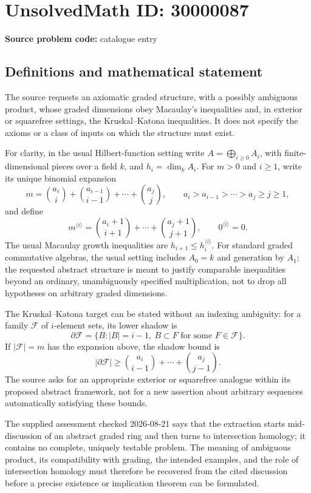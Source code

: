 \documentclass[11pt]{article}
\begin{document}
\section*{UnsolvedMath ID: 30000087}
\textbf{Source problem code:} catalogue entry
\subsection{Definitions and mathematical statement}
The source requests an axiomatic graded structure, with a possibly ambiguous product, whose graded dimensions obey Macaulay's inequalities and, in exterior or squarefree settings, the Kruskal--Katona inequalities. It does not specify the axioms or a class of inputs on which the structure must exist.

For clarity, in the usual Hilbert-function setting write \(A=\bigoplus_{i\geq0}A_i\), with finite-dimensional pieces over a field \(k\), and \(h_i=\dim_k A_i\). For \(m>0\) and \(i\geq1\), write its unique binomial expansion
\[
m=\binom{a_i}{i}+\binom{a_{i-1}}{i-1}+\cdots+\binom{a_j}{j},
\qquad a_i>a_{i-1}>\cdots>a_j\geq j\geq1,
\]
and define
\[
m^{\langle i\rangle}=\binom{a_i+1}{i+1}+\cdots+\binom{a_j+1}{j+1},
\qquad 0^{\langle i\rangle}=0.
\]
The usual Macaulay growth inequalities are \(h_{i+1}\leq h_i^{\langle i\rangle}\). For standard graded commutative algebras, the usual setting includes \(A_0=k\) and generation by \(A_1\); the requested abstract structure is meant to justify comparable inequalities beyond an ordinary, unambiguously specified multiplication, not to drop all hypotheses on arbitrary graded dimensions.

The Kruskal--Katona target can be stated without an indexing ambiguity: for a family \(\mathcal F\) of \(i\)-element sets, its lower shadow is
\[
\partial\mathcal F=\{B:|B|=i-1,\ B\subset F\text{ for some }F\in\mathcal F\}.
\]
If \(|\mathcal F|=m\) has the expansion above, the shadow bound is
\[
|\partial\mathcal F|\geq\binom{a_i}{i-1}+\cdots+\binom{a_j}{j-1}.
\]
The source asks for an appropriate exterior or squarefree analogue within its proposed abstract framework, not for a new assertion about arbitrary sequences automatically satisfying these bounds.

The supplied assessment checked 2026-08-21 says that the extraction starts mid-discussion of an abstract graded ring and then turns to intersection homology; it contains no complete, uniquely testable problem. The meaning of ambiguous product, its compatibility with grading, the intended examples, and the role of intersection homology must therefore be recovered from the cited discussion before a precise existence or implication theorem can be formulated.
\end{document}
